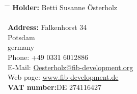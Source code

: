 \documentclass[12pt,a4paper]{article}
\begin{document}
\begin{tabbing}
\hspace{35mm}\=\hspace{20mm} \=\kill
\textbf{Holder:} \> Betti Susanne \"{O}sterholz \>\\
 \> \>\\
\textbf{Address:}\> Falkenhorst 34 \>\\
	  Potsdam \>\\
	\>germany \>\\
	\>Phone: \>+49 0331 6012886\\
	\>E-Mail: \>\url{Oesterholz@fib-development.org}\\
	\>Web page: \>\url{www.fib-development.de}\\
\textbf{VAT number:}\>DE 274116427 \>\\
\end{tabbing}
\end{document}
